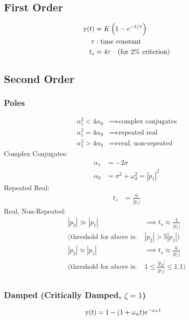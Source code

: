 \documentclass[8pt]{extarticle}
\begin{document}
\begin{multicols*}{3}
\subsection*{First Order}
\begin{align*}
    \func{y}[t] &= K \left(1 - e^{-t/\tau}\right) \\
    \tau &: \text{time constant} \\
    t_s &\approx 4\tau \quad (\text{for 2\% criterion})
\end{align*}

\subsection*{Second Order}
\subsubsection*{Poles}
\begin{align*}
    \alpha_1^2 < 4 \alpha_0 &\implies \text{complex conjugates} \\
    \alpha_1^2 = 4 \alpha_0 &\implies \text{repeated real} \\
    \alpha_1^2 > 4 \alpha_0 &\implies \text{real, non-repeated}
\end{align*}
Complex Conjugates:
\begin{align*}
    \alpha_1 &= -2 \sigma \\
    \alpha_0 &= \sigma^2 + \omega_d^2 = |p_1|^2
\end{align*}
Repeated Real:
\begin{align*}
    t_s &= \frac{6}{|p_1|}
\end{align*}
Real, Non-Repeated:
\begin{align*}
    |p_2| \gg |p_1| &\implies t_s \approx \frac{4}{|p_1|} \\
    (\text{threshold for above is: } & |p_2|>5|p_1|)\\
    |p_2| \approx |p_1| &\implies t_s \approx \frac{6}{|p_1|} \\
    (\text{threshold for above is: } & 1 \leqslant \frac{|p_2|}{|p_1|} \leqslant 1.1)\\
\end{align*}

\subsubsection*{Damped (Critically Damped, \(\zeta = 1\))}
\begin{align*}
    \func{y}[t] &= 1 - (1+\omega_n t)e^{-\omega_n t}
\end{align*}


\end{multicols*}
\end{document}
